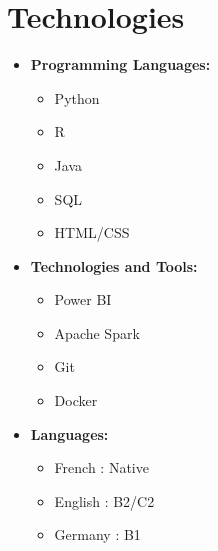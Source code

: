 \documentclass[10pt, letterpaper]{article}
\begin{document}
    \section{Technologies}
        \begin{itemize}
            \item \textbf{Programming Languages:}
            \begin{itemize}
                \item Python
                \item R
                \item Java
                \item SQL
                \item HTML/CSS
            \end{itemize}
            
            \item \textbf{Technologies and Tools:}
            \begin{itemize}
                \item Power BI
                \item Apache Spark
                \item Git
                \item Docker
            \end{itemize}

            \item \textbf{Languages:}
            \begin{itemize}
                \item French : Native
                \item English : B2/C2
                \item Germany :  B1
            \end{itemize}
    \end{itemize}
\end{document}
